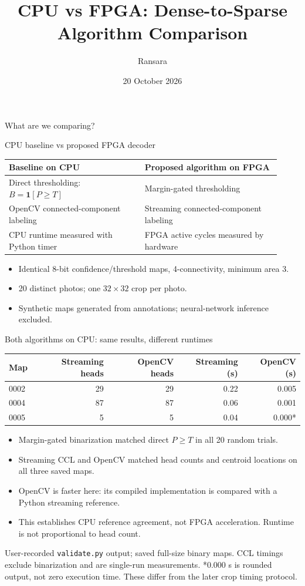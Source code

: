 \documentclass[aspectratio=169,10pt]{beamer}
\title{CPU vs FPGA: Dense-to-Sparse Algorithm Comparison}
\author{Ransara}
\date{20 October 2026}
\begin{document}
\begin{frame}{What are we comparing?}
\begin{center}\Large CPU baseline vs proposed FPGA decoder\end{center}
\medskip
\begin{tabular}{p{0.46\linewidth}p{0.46\linewidth}}
\toprule
\textbf{Baseline on CPU} & \textbf{Proposed algorithm on FPGA} \\
\midrule
Direct thresholding: $B=\mathbf{1}[P\ge T]$ & Margin-gated thresholding \\
OpenCV connected-component labeling & Streaming connected-component labeling \\
CPU runtime measured with Python timer & FPGA active cycles measured by hardware \\
\bottomrule
\end{tabular}
\medskip
\begin{itemize}
\item Identical 8-bit confidence/threshold maps, 4-connectivity, minimum area 3.
\item 20 distinct photos; one $32\times32$ crop per photo.
\item Synthetic maps generated from annotations; neural-network inference excluded.
\end{itemize}
\end{frame}

\begin{frame}{Both algorithms on CPU: same results, different runtimes}
\begin{center}
\begin{tabular}{lrrrr}
\toprule
Map & Streaming heads & OpenCV heads & Streaming (s) & OpenCV (s) \\
\midrule
0002 & 29 & 29 & 0.22 & 0.005 \\
0004 & 87 & 87 & 0.06 & 0.001 \\
0005 & 5 & 5 & 0.04 & 0.000* \\
\bottomrule
\end{tabular}
\end{center}
\begin{itemize}
\item Margin-gated binarization matched direct $P\geq T$ in all 20 random trials.
\item Streaming CCL and OpenCV matched head counts and centroid locations on all three saved maps.
\item OpenCV is faster here: its compiled implementation is compared with a Python streaming reference.
\item This establishes CPU reference agreement, not FPGA acceleration. Runtime is not proportional to head count.
\end{itemize}
\scriptsize User-recorded \texttt{validate.py} output; saved full-size binary maps. CCL timings exclude binarization and are single-run measurements. *0.000 s is rounded output, not zero execution time. These differ from the later crop timing protocol.
\end{frame}
\end{document}
